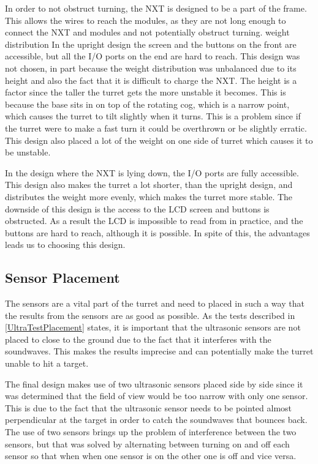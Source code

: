 In order to not obstruct turning, the NXT is designed to be a part of the
frame. This allows the wires to reach the modules, as they are not long
enough to connect the NXT and modules and not potentially obstruct
turning.\nl
weight distribution
In the upright design the screen and the buttons on the front
are accessible, but all the I/O ports on the end are hard to reach. This
design was not chosen, in part because the weight distribution was unbalanced due to its height and also the fact that it is difficult to
charge the NXT. The height is a factor since the taller the turret gets the
more unstable it becomes. This is because the base sits in on top of the
rotating cog, which is a narrow point, which causes the turret to tilt
slightly when it turns. This is a problem since if the turret were to make a
fast turn it could be overthrown or be slightly erratic. This design also
placed a lot of the weight on one side of turret which causes it to be
unstable.\nl

In the design where the NXT is lying down, the I/O ports are fully accessible.
This design also makes the turret a lot shorter, than the upright design, and
distributes the weight more evenly, which makes the turret more stable. The downside of this design is the access to the LCD screen and buttons is obstructed. As a result the LCD is impossible to read from in practice, and the buttons are hard to reach, although it is possible. In spite of this, the advantages leads us to choosing this design.

\subsection{Sensor Placement}
The sensors are a vital part of the turret and need to placed in such a way that
the results from the sensors are as good as possible. As the tests described in
\autoref{UltraTestPlacement} states, it is important that the ultrasonic sensors
are not placed to close to the ground due to the fact that it interferes with
the soundwaves. This makes the results imprecise and can potentially make the
turret unable to hit a target.\nl

The final design makes use of two ultrasonic sensors placed side by side since
it was determined that the field of view would be too narrow with only one
sensor. This is due to the fact that the ultrasonic sensor needs to be pointed
almost perpendicular at the target in order to catch the soundwaves that bounces
back. The use of two sensors brings up the problem of interference between the
two sensors, but that was solved by alternating between turning on and off each
sensor so that when when one sensor is on the other one is off and vice
versa.\nl

